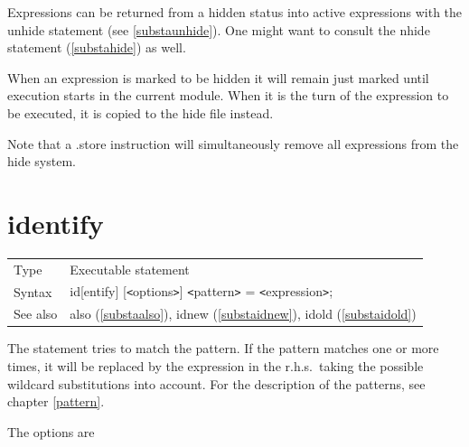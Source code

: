 \noindent Expressions can be returned from a hidden status into active 
expressions with the unhide statement (see 
\ref{substaunhide}). One might want to consult the nhide 
statement (\ref{substahide}) as well. \vspace{4mm}

\noindent When an expression is marked to be hidden it will remain just 
marked until execution starts in the current module. When it is the turn of 
the expression to be executed, it is copied to the hide file instead. 
\vspace{4mm}

\noindent Note that a .store instruction will simultaneously remove all 
expressions from the hide system. \vspace{10mm}


\section{identify}
\label{substaidentify}

\noindent \begin{tabular}{ll}
Type & Executable statement\\
Syntax & id[entify] [{\tt<}options{\tt>}] {\tt<}pattern{\tt>} = {\tt<}expression{\tt>};
\\ See also & also (\ref{substaalso}),
              idnew (\ref{substaidnew}),
              idold (\ref{substaidold})
\end{tabular}\vspace{4mm}

\noindent The statement tries to match the 
pattern. If the pattern matches one or more times, it will 
be replaced by the expression in the r.h.s.\ taking the possible 
wildcard substitutions into account. For the description of 
the patterns, see chapter \ref{pattern}.

\noindent The options are \vspace{1mm}



